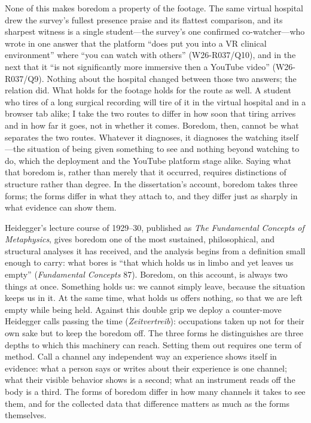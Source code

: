 None of this makes boredom a property of the footage. The same virtual
hospital drew the survey's fullest presence praise and its flattest
comparison, and its sharpest witness is a single student---the survey's
one confirmed co-watcher---who wrote in one answer that the platform
``does put you into a VR clinical environment'' where ``you can watch
with others'' (W26-R037/Q10), and in the next that it ``is not
significantly more immersive then a YouTube video'' (W26-R037/Q9).
Nothing about the hospital changed between those two answers; the
relation did. What holds for the footage holds for the route as well. A
student who tires of a long surgical recording will tire of it in the
virtual hospital and in a browser tab alike; I take the two routes to
differ in how soon that tiring arrives and in how far it goes, not in
whether it comes. Boredom, then, cannot be what separates the two
routes. Whatever it diagnoses, it diagnoses the watching itself---the
situation of being given something to see and nothing beyond watching to
do, which the deployment and the YouTube platform stage alike. Saying what that
boredom is, rather than merely that it occurred, requires distinctions
of structure rather than degree. In the dissertation's account, boredom
takes three forms; the forms differ in what they attach to, and they
differ just as sharply in what evidence can show them.

Heidegger's lecture course of 1929--30, published as \textit{The
Fundamental Concepts of Metaphysics}, gives boredom one of the most
sustained, philosophical, and structural analyses it has received, and
the analysis begins from a definition small enough to carry: what
bores is ``that which holds us in limbo and yet leaves us empty''
(\textit{Fundamental Concepts} 87). Boredom, on this account, is
always two things at once. Something holds us: we cannot simply leave,
because the situation keeps us in it. At the same time, what holds us
offers nothing, so that we are left empty while being held. Against this
double grip we deploy a counter-move Heidegger calls passing the time
(\textit{Zeitvertreib}): occupations taken up not for their own sake
but to keep the boredom off. The three forms he distinguishes are
three depths to which this machinery can reach. Setting them out
requires one term of method. Call a channel any independent way an
experience shows itself in evidence: what a person says or writes
about their experience is one channel; what their visible behavior
shows is a second; what an instrument reads off the body is a third.
The forms of boredom differ in how many channels it takes to see them,
and for the collected data that difference matters as much as the
forms themselves.

